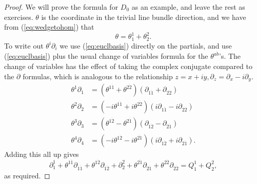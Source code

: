 \documentclass[twoside]{amsart}
\renewcommand{\eqref}[1]{(\ref{eq:#1})}
\newcommand{\enm}[1]{\ensuremath{#1}}
\newcommand{\bothupperabc}[3]{\enm{{#1}^{#2 #3}}}
\newcommand{\bothlowerabc}[3]{\enm{{#1}_{#2 #3}}}
\newcommand{\upperlowerabc}[3]{\enm{{#1}^{#2}_{#3}}}
\newcommand{\dotbothupperabc}[3]{\bothupperabc{#1}{#2}{\dot{#3}}}
\newcommand{\dotbothlowerabc}[3]{\bothlowerabc{#1}{#2}{\dot{#3}}}
\newcommand{\tudu}[2]{\dotbothupperabc{\theta}{#1}{#2}}
\newcommand{\pldl}[2]{\dotbothlowerabc{\partial}{#1}{#2}}
\newcommand{\qul}[2]{\upperlowerabc{Q}{#1}{#2}}
\begin{document}
\begin{proof}
We will prove the formula for \( D_{0} \) as an example, and leave
the
rest as exercises.  \( \theta
\) is the coordinate in the trivial line bundle direction, and we
have
from \eqref{wedgetohom} that
\[ \theta = \theta^{1}_{1} + \theta^{2}_{2}. \]
To write out \( \theta^{i}\partial_{i} \) we use \eqref{euclbasis}
directly  on
the partials, and use \eqref{euclbasis} plus the usual change of variables
formula for the \( \tudu{a}{b}
\)'s.  The change of variables has the effect of taking the complex
conjugate compared to
the \( \partial \) formulas, which is analogous to the relationship
\(
z = x+iy, \partial_{z} = \partial_{x} - i\partial_{y}. \)
\begin{align*}
    \theta^{1}\partial_{1} &= ( \tudu{1}{1} +  \tudu{2}{2})
                              ( \pldl{1}{1} +  \pldl{2}{2}) \\
    \theta^{2}\partial_{2} &= (-i\tudu{1}{1} + i\tudu{2}{2})
                              (i\pldl{1}{1} - i\pldl{2}{2}) \\
    \theta^{3}\partial_{3} &= ( \tudu{1}{2} -  \tudu{2}{1})
                              ( \pldl{1}{2} -  \pldl{2}{1}) \\
    \theta^{4}\partial_{4} &= (-i\tudu{1}{2} - i\tudu{2}{1})
                              (i\pldl{1}{2} + i\pldl{2}{1}).
\end{align*}
Adding this all up gives
\[ \partial^{1}_{1} + \tudu{1}{1}\pldl{1}{1} +
\tudu{1}{2}\pldl{1}{2} + \partial^{2}_{2} +
\tudu{2}{1}\pldl{2}{1} + \tudu{2}{2}\pldl{2}{2} = \qul{1}{1} +
\qul{2}{2}, \]
as required.
\end{proof}
\end{document}
